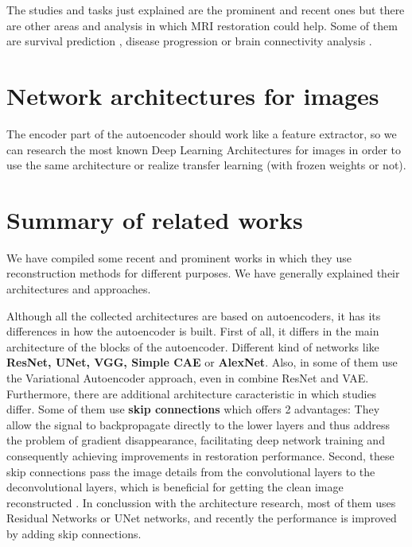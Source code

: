 The studies and tasks just explained are the prominent and recent ones but there are other areas and analysis in which MRI restoration could help. Some of them are survival prediction \cite{AnexoReviewAditional}, disease progression \cite{AnexoProgression} or brain connectivity analysis   \cite{AnexoConnectivity}.



\section{Network architectures for images}

The encoder part of the autoencoder should work like a feature extractor, so we can research the most known Deep Learning Architectures for images in order to use the same architecture or realize transfer learning (with frozen weights or not).




\section{Summary of related works}

We have compiled some recent and prominent works in which they use reconstruction methods for different purposes. We have generally explained their architectures and approaches.

Although all the collected architectures are based on autoencoders, it has its differences in how the autoencoder is built. First of all, it differs in the main architecture of the blocks of the autoencoder. Different kind of networks like \textbf{ResNet, UNet, VGG, Simple CAE} or \textbf{AlexNet}. Also, in some of them use the Variational Autoencoder approach, even in \cite{myronenko20183d} combine ResNet and VAE. 
Furthermore, there are additional architecture caracteristic in which studies differ. Some of them use \textbf{skip connections} which offers 2 advantages: They allow the signal to backpropagate directly to the lower layers and thus address the problem of gradient disappearance, facilitating deep network training and consequently achieving improvements in restoration performance. Second, these skip connections pass the image details from the convolutional layers to the deconvolutional layers, which is beneficial for getting the clean image reconstructed \cite{superresolution}. In conclussion with the architecture research, most of them uses Residual Networks or UNet networks, and recently the performance is improved by adding skip connections.


